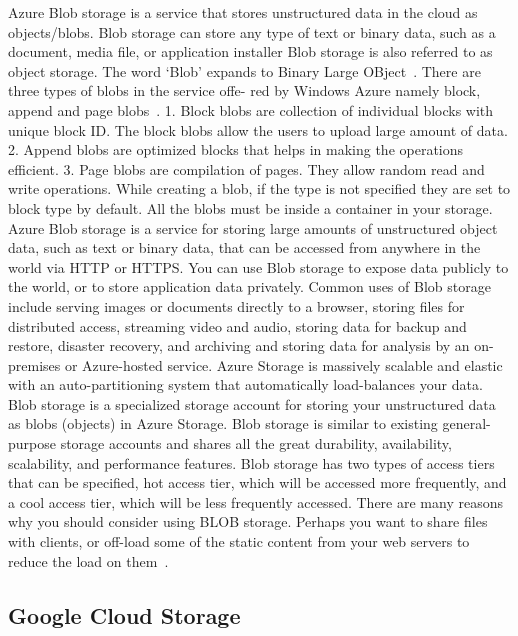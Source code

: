 Azure Blob storage is a service that stores unstructured data in the
cloud as objects/blobs. Blob storage can store any type of text or
binary data, such as a document, media file, or application installer
Blob storage is also referred to as object storage. The word ‘Blob’
expands to Binary Large OBject~\cite{www-azure-3}. There are three
types of blobs in the service offe- red by Windows Azure namely block,
append and page blobs~\cite{www-azure-2}.  1. Block blobs are
collection of individual blocks with unique block ID.  The block blobs
allow the users to upload large amount of data.  2. Append blobs are
optimized blocks that helps in making the operations efficient.
3. Page blobs are compilation of pages. They allow random read and
write operations. While creating a blob, if the type is not specified
they are set to block type by default. All the blobs must be inside a
container in your storage.  Azure Blob storage is a service for
storing large amounts of unstructured object data, such as text or
binary data, that can be accessed from anywhere in the world via HTTP
or HTTPS. You can use Blob storage to expose data publicly to the
world, or to store application data privately. Common uses of Blob
storage include serving images or documents directly to a browser,
storing files for distributed access, streaming video and audio,
storing data for backup and restore, disaster recovery, and archiving
and storing data for analysis by an on-premises or Azure-hosted
service.  Azure Storage is massively scalable and elastic with an
auto-partitioning system that automatically load-balances your
data. Blob storage is a specialized storage account for storing your
unstructured data as blobs (objects) in Azure Storage. Blob storage is
similar to existing general-purpose storage accounts and shares all
the great durability, availability, scalability, and performance
features. Blob storage has two types of access tiers that can be
specified, hot access tier, which will be accessed more frequently,
and a cool access tier, which will be less frequently accessed. There
are many reasons why you should consider using BLOB storage. Perhaps
you want to share files with clients, or off-load some of the static
content from your web servers to reduce the load on
them~\cite{www-azure-3}.

     \pv

\subsection{Google Cloud Storage}

